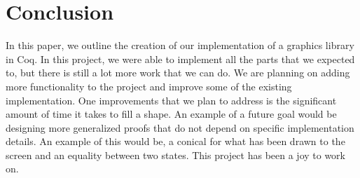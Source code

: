 \documentclass{llncs}
\begin{document}
\section{Conclusion}
In this paper, we outline the creation of our implementation of a graphics
library in Coq. In this project, we were able to implement all the parts that we
expected to, but there is still a lot more work that we can do. We are planning
on adding more functionality to the project and improve some of the existing
implementation. One improvements that we plan to address is the significant
amount of time it takes to fill a shape. An example of a future goal would be
designing more generalized proofs that do not depend on specific implementation
details. An example of this would be, a conical for what has been drawn to the
screen and an equality between two states. This project has been a joy to work
on.





\end{document}
